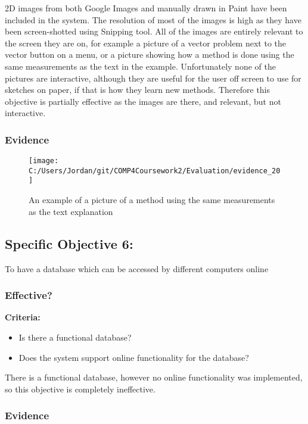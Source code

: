 2D images from both Google Images and manually drawn in Paint have been included in the system. The resolution of most of the images is high as they have been screen-shotted using Snipping tool. All of the images are entirely relevant to the screen they are on, for example a picture of a vector problem next to the vector button on a menu, or a picture showing how a method is done using the same measurements as the text in the example. Unfortunately none of the pictures are interactive, although they are useful for the user off screen to use for sketches on paper, if that is how they learn new methods. Therefore this objective is partially effective as the images are there, and relevant, but not interactive.

\subsubsection{Evidence}

\begin{figure}[H]
	\texttt{[image: C:/Users/Jordan/git/COMP4Coursework2/Evaluation/evidence\_20]}
	\caption{An example of a picture of a method using the same measurements as the text explanation}
\end{figure}

\subsection{Specific Objective 6: }

To have a database which can be accessed by different computers online

\subsubsection{Effective?}

\textbf{Criteria: }

\begin{itemize}
	\item Is there a functional database?
	\item Does the system support online functionality for the database?
\end{itemize}

There is a functional database, however no online functionality was implemented, so this objective is completely ineffective.

\subsubsection{Evidence}

